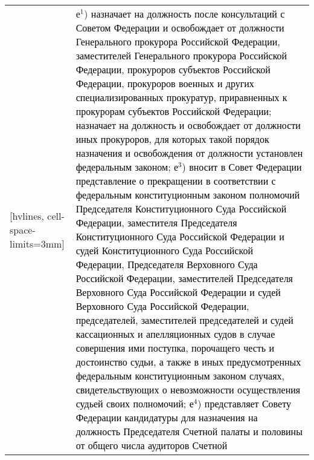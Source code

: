 \documentclass[a4paper,14pt]{extarticle}
\begin{document}
	\pagebreak
	\noindent
	\begin{NiceTabular}{p{92mm}p{91mm}}[hvlines, cell-space-limits=3mm]
		& е$^1$) \textcolor{black}{назначает на должность после консультаций с Советом Федерации и освобождает от должности Генерального прокурора Российской Федерации, заместителей Генерального прокурора Российской Федерации, прокуроров субъектов Российской Федерации, прокуроров военных и других специализированных прокуратур, приравненных к прокурорам субъектов Российской Федерации; назначает на должность и освобождает от должности иных прокуроров, для которых такой порядок назначения и освобождения от должности установлен федеральным законом;} \newline
		\textcolor{black}{е$^3$) вносит в Совет Федерации представление о прекращении в соответствии с федеральным конституционным законом полномочий Председателя Конституционного Суда Российской Федерации, заместителя Председателя Конституционного Суда Российской Федерации и судей Конституционного Суда Российской Федерации, Председателя Верховного Суда Российской Федерации, заместителей Председателя Верховного Суда Российской Федерации и судей Верховного Суда Российской Федерации, председателей, заместителей председателей и судей кассационных и апелляционных судов в случае совершения ими поступка, порочащего честь и достоинство судьи, а также в иных предусмотренных федеральным конституционным законом случаях, свидетельствующих о невозможности осуществления судьей своих полномочий;} \newline
		\textcolor{black}{е$^4$) представляет Совету Федерации кандидатуры для назначения на должность Председателя Счетной палаты и половины от общего числа аудиторов Счетной}
	\end{NiceTabular}
	
\end{document}
